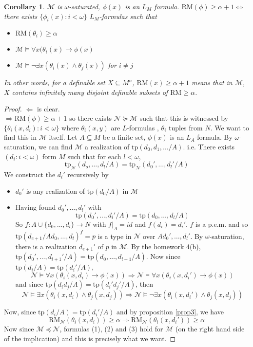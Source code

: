 \documentclass[letterpaper, 12pt]{article}
\newcommand{\cM}{\mathcal{M}}
\newcommand{\cN}{\mathcal{N}}
\newcommand{\tp}{\mbox{tp}}
\newcommand{\RM}{\mbox{RM}}
\theoremstyle{stdthm}
\newtheorem{cor}[thm]{Corollary}
\theoremstyle{stddef}
\theoremstyle{stdnonum}
\theoremstyle{stdqands}
\theoremstyle{stdbold}
\begin{document}
\begin{cor}
$\cM$ is $\omega$-saturated, $\phi(x)$ is an $L_M$ formula. $\RM(\phi)\geq \alpha + 1 \iff$ there exists $\{\phi_i(x) : i < \omega \}$ $L_M$-formulas such that 
\begin{itemize}
\item $\RM(\theta_i) \geq \alpha$ 
\item $\cM \models \forall x(\theta_i(x) \to \phi(x)$
\item $\cM \models \neg \exists x(\theta_i(x) \wedge \theta_j(x))$ for $i\neq j$ 
\end{itemize}
In other words, for a definable set $X \subseteq M^n$, $\RM(x) \geq \alpha + 1$ means that in $\cM$, $X$ contains infinitely many disjoint definable subsets of $\RM \geq \alpha$.  

\end{cor}

\begin{proof}
$\Leftarrow $ is clear. \\

\noindent $\Rightarrow \RM(\phi) \geq \alpha + 1$ so there exists $\cN \succeq \cM$ such that  this is witnessed by $\{\theta_i(x,d_i): i < \omega\}$ where $\theta_i(x,y)$ are $L$-formulas , $\theta_i$ tuples from $N$. We want to find this in $\cM$ itself. Let $A \subseteq M$ be a finite set, $\phi(x)$ is an $L_A$-formula. By $\omega$-saturation, we can find $\cM$ a realization of $\tp(d_0,d_1,\dots/A)$. i.e. There exists $(d_i: i<\omega)$ form $M$ such that for each $l < \omega$, 
\[ \tp_\cN(d_o,\dots, d_l/A) = \tp_\cN(d_0',\dots, d_l'/A) \] 
We construct the $d_i'$ recursively by 
\begin{itemize}
\item $d_0'$ is any realization of $\tp(d_0/A)$ in $\cM$ 
\item  Having found $d_0',\dots, d_l'$ with 
\[ \tp(d_0',\dots, d_l'/A) = \tp(d_0,\dots, d_l/A) \]
So $f:A \cup \{d_0,\dots, d_l\} \to N$ with $f|_A = id$ and $f(d_i) = d_i'$. $f$ is a p.e.m. and so $\tp(d_{e+1}/Ad_0,\dots, d_l)^f = p$ is a type in $\cN$ over $Ad_0',\dots, d_l'$. By $\omega$-saturation, there is a realization $d_{e+1}'$ of $p$ in $\cM$. By the homework 4(b), $\tp(d_0',\dots, d_{l+1}'/A) = \tp(d_0,\dots, d_{l+1}/A)$. Now since $\tp(d_i/A) = \tp(d_i'/A)$, 
\[ \tag{1} \cN \models \forall x(\theta_i(x,d_i) \to \phi(x)) \Rightarrow \cN \models \forall x(\theta_i(x,d_i') \to \phi(x)) \] 
and since $\tp(d_id_j/A) = \tp(d_i'd_j'/A)$, then 
\[ \tag{2} \cN \models \exists x(\theta_i(x,d_i) \wedge \theta_j(x,d_j)) \Rightarrow \cN \models \neg \exists x(\theta_i(x,d_i') \wedge \theta_j(x,d_j)) \]
\end{itemize}
Now, since $\tp(d_i/A) = \tp(d_i'/A)$ and by proposition \ref{prop3}, we have 
\[ \tag{3} \RM_\cN(\theta_i(x,d_i)) \geq \alpha  \Rightarrow \RM_\cN(\theta_i(x,d_i')) \geq \alpha \] 
Now since $\cM \preceq \cN$, formulas (1), (2) and (3) hold for $\cM$ (on the right hand side of the implication) and this is precisely what we want.  
\end{proof}
\end{document}
